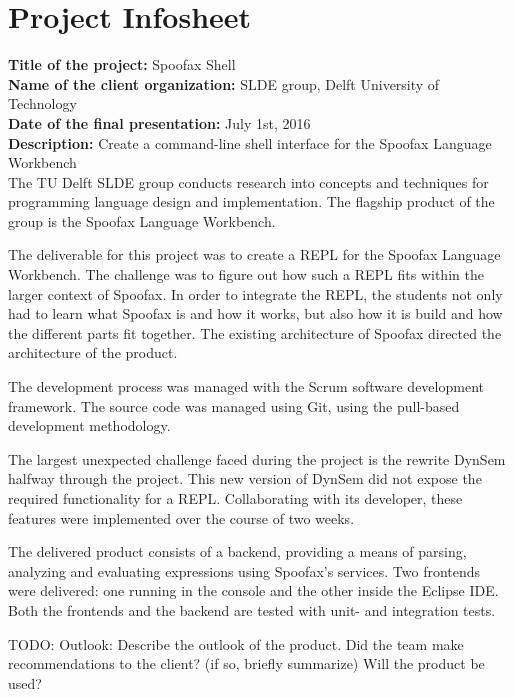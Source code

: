 \chapter{Project Infosheet}
\label{cha:infosheet}

\textbf{Title of the project:} Spoofax Shell\\
\textbf{Name of the client organization:} SLDE group, Delft University of Technology\\
\textbf{Date of the final presentation:} July 1st, 2016\\
\textbf{Description:} Create a command-line shell interface for the Spoofax
Language Workbench\\

The TU Delft SLDE group conducts research into concepts and techniques for
programming language design and implementation. The flagship product of the
group is the Spoofax Language Workbench.

The deliverable for this project was to create a REPL for the Spoofax Language
Workbench. The challenge was to figure out how such a REPL fits within the larger
context of Spoofax. In order to integrate the REPL, the students not only had
to learn what Spoofax is and how it works, but also how it is build and how the
different parts fit together. The existing architecture of Spoofax directed the
architecture of the product.

The development process was managed with the Scrum software development
framework. The source code was managed using Git, using the pull-based
development methodology.

The largest unexpected challenge faced during the project is the rewrite DynSem
halfway through the project. This new version of DynSem did not expose the
required functionality for a REPL. Collaborating with its developer, these
features were implemented over the course of two weeks.

The delivered product consists of a backend, providing a means of parsing,
analyzing and evaluating expressions using Spoofax's services. Two frontends
were delivered: one running in the console and the other inside the Eclipse IDE.
Both the frontends and the backend are tested with unit- and integration tests.

TODO: Outlook: Describe the outlook of the product. Did the team make recommendations to the 
client? (if so, briefly summarize) Will the product be used?\\

